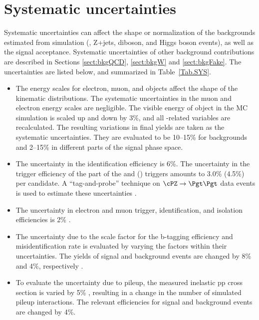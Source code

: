 \section{Systematic uncertainties}
\label{sect:sys}
Systematic uncertainties can affect the shape or normalization of the
backgrounds estimated from simulation (\ttbar, Z+jets, diboson, and Higgs boson events), 
as well as the signal acceptance. 
Systematic uncertainties of other background contributions are described in Sections \ref{sect:bkgQCD}, \ref{sect:bkgW} and \ref{sect:bkgFake}.
The uncertainties are listed below, and summarized in Table~\ref{Tab.SYS}.

\begin{itemize}


\item  The energy scales for electron, muon, and \Tau objects affect the shape of the kinematic distributions.
 The systematic uncertainties in the muon and electron energy scales are negligible.
The visible energy of \Tau object in the MC simulation is scaled up and down
by 3\%, and all \Tau-related variables are recalculated. The resulting variations in
final yields are taken as the systematic uncertainties. They are evaluated to be 10--15\% for 
backgrounds and 2--15\% in different parts of the signal phase space.

\item The uncertainty in the \Tau identification efficiency is 6\%. The uncertainty in the trigger 
efficiency of the \Tau part of the \eTau and \muTau (\tauTau) triggers amounts to 3.0\% (4.5\%) per 
\Tau candidate. A ``tag-and-probe'' technique \cite{Chatrchyan:2014mua} on $\cPZ\to \Pgt\Pgt$ data 
events is used to estimate these uncertainties \cite{Khachatryan:2014wca}.

\item The uncertainty in electron and muon trigger, identification, and
isolation efficiencies is 2\% \cite{Khachatryan:2014wca}.

\item The uncertainty due to the scale factor for the b-tagging efficiency and misidentification 
rate is evaluated by varying the factors within their uncertainties. The yields of signal and background events are changed by 8\% 
and 4\%, respectively \cite{Chatrchyan:2012jua}.
 
\item To evaluate the uncertainty due to pileup, the measured inelastic pp cross section is
  varied by 5\% \cite{Antchev:2011vs}, resulting in a change in the number of simulated pileup interactions.
 The relevant efficiencies for signal and background events are changed by 4\%.


\end{itemize}
